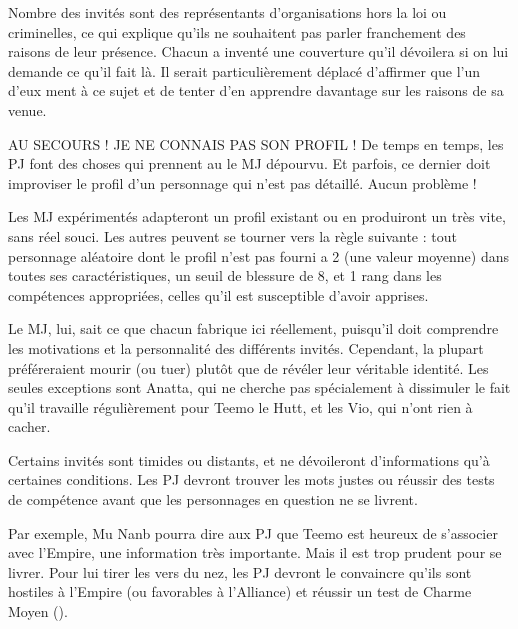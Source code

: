 \documentclass[a4paper,10pt,twoside,twocolumn,openany]{book}
\begin{document}
\subtitle{LES COUVERTURES DES UNS
ET DES AUTRES}

Nombre des invités sont des représentants d’organisations hors la loi ou criminelles, ce qui explique qu’ils ne
souhaitent pas parler franchement des raisons de leur présence. Chacun a inventé une couverture qu’il dévoilera si on lui demande ce qu’il fait là. Il serait particulièrement déplacé d’affirmer que l’un d’eux ment à ce sujet
et de tenter d’en apprendre davantage sur les raisons de
sa venue.

\begin{commentbox}{AU SECOURS !
JE NE CONNAIS PAS SON PROFIL !}
  De temps en temps, les PJ font des choses qui
prennent au le MJ dépourvu. Et parfois, ce dernier
doit improviser le profil d’un personnage qui n’est
pas détaillé. Aucun problème !

Les MJ expérimentés adapteront un profil existant
ou en produiront un très vite, sans réel souci. Les
autres peuvent se tourner vers la règle suivante :
tout personnage aléatoire dont le profil n’est pas
fourni a 2 (une valeur moyenne) dans toutes ses caractéristiques, un seuil de blessure de 8, et 1 rang
dans les compétences appropriées, celles qu’il est
susceptible d’avoir apprises.
\end{commentbox}



Le MJ, lui, sait ce que chacun fabrique ici réellement,
puisqu’il doit comprendre les motivations et la personnalité des différents invités. Cependant, la plupart préféreraient mourir (ou tuer) plutôt que de révéler leur véritable identité. Les seules exceptions sont Anatta, qui
ne cherche pas spécialement à dissimuler le fait qu’il
travaille régulièrement pour Teemo le Hutt, et les Vio, qui
n’ont rien à cacher.

\subtitle{BRISER LA GLACE}

Certains invités sont timides ou distants, et ne dévoileront d’informations qu’à certaines conditions. Les PJ
devront trouver les mots justes ou réussir des tests de
compétence avant que les personnages en question ne
se livrent.

Par exemple, Mu Nanb pourra dire aux PJ que Teemo
est heureux de s’associer avec l’Empire, une information
très importante. Mais il est trop prudent pour se livrer.
Pour lui tirer les vers du nez, les PJ devront le convaincre
qu’ils sont hostiles à l’Empire (ou favorables à l’Alliance)
et réussir un test de Charme Moyen (\difficulty \difficulty).

\subtitle{UN COMPORTEMENT DÉPLACÉ}
\end{document}
